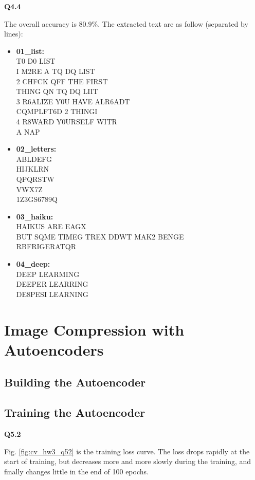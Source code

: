 \documentclass[
  course = {{16-720B Computer Vision}},
  quartile = {{1}},
  assignment = 3-Neural\ Networks\ for\ Recognition,
  name = {{Kangle Deng}},
  email = {{kangled@andrew.cmu.edu}},
  firstexercise = 1
]{aga-homework}
\begin{document}
\noindent \textbf{Q4.4}

The overall accuracy is $80.9\%$. The extracted text are as follow (separated by lines):
\begin{itemize}
    \item \textbf{01\_list:} \\ T0 D0 LIST\\ I M2RE A TQ DQ LIST \\ 2 CHFCK QFF THE FIRST\\ THING QN TQ DQ LIIT\\ 3 R6ALIZE Y0U HAVE ALR6ADT\\ CQMPLFT6D 2 THINGI\\ 4 R8WARD Y0URSELF WITR\\ A NAP
    \item \textbf{02\_letters:} \\ ABLDEFG \\ HIJKLRN \\ QPQRSTW \\ VWX7Z \\ 1Z3GS6789Q
    \item \textbf{03\_haiku:}\\ HAIKUS ARE EAGX \\ BUT SQME TIMEG TREX DDWT MAK2 BENGE \\ RBFRIGERATQR
    \item \textbf{04\_deep:} \\ DEEP LEARMING \\ DEEPER LEARRING \\ DE8PESI LEARNING
    
\end{itemize}


\section{Image Compression with Autoencoders}
\subsection{Building the Autoencoder}
\subsection{Training the Autoencoder}
\noindent\textbf{Q5.2}

Fig. \ref{fig:cv_hw3_q52} is the training loss curve. The loss drops rapidly at the start of training, but decreases more and more slowly during the training, and finally changes little in the end of 100 epochs.
\end{document}
